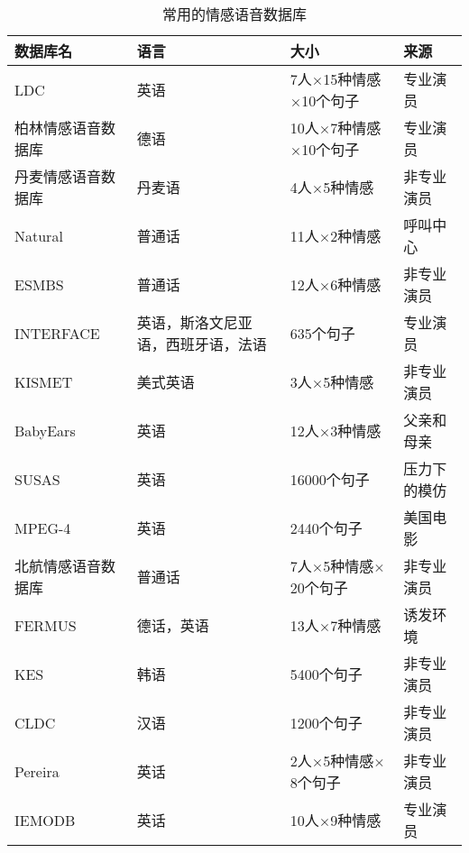 \begin{table}[htb]
\centering
    \begin{minipage}[t]{0.8\linewidth} %
    \caption{常用的情感语音数据库}
    \label{tab:emo_database}
        \begin{tabularx}{\linewidth}{X<{\centering} X<{\centering} X<{\centering} X<{\centering}}
            \toprule[1.5pt]
            数据库名 & 语言 & 大小 & 来源 \\
            \midrule[1pt]
            LDC & 英语 & 7人$\times$15种情感$\times$10个句子 & 专业演员 \\
            柏林情感语音数据库 & 德语 & 10人$\times$7种情感$\times$10个句子 & 专业演员 \\
            丹麦情感语音数据库 & 丹麦语 & 4人$\times$5种情感 & 非专业演员 \\
            Natural & 普通话 & 11人$\times$2种情感 & 呼叫中心 \\
            ESMBS & 普通话 & 12人$\times$6种情感 & 非专业演员 \\
            INTERFACE & 英语，斯洛文尼亚语，西班牙语，法语 & 635个句子 & 专业演员 \\
            KISMET & 美式英语 & 3人$\times$5种情感 & 非专业演员 \\
            BabyEars & 英语 & 12人$\times$3种情感 & 父亲和母亲 \\
            SUSAS & 英语 & 16000个句子 & 压力下的模仿 \\
            MPEG-4 & 英语 & 2440个句子 & 美国电影 \\
            北航情感语音数据库 & 普通话 & 7人$\times$5种情感$\times$20个句子 & 非专业演员 \\
            FERMUS \uppercase\expandafter{\romannumeral3} & 德话，英语 & 13人$\times$7种情感 & 诱发环境 \\
            KES & 韩语 & 5400个句子 & 非专业演员 \\
            CLDC & 汉语 & 1200个句子 & 非专业演员 \\
            Pereira & 英话 & 2人$\times$5种情感$\times$8个句子 & 非专业演员 \\
            IEMODB & 英话 & 10人$\times$9种情感 & 专业演员 \\
            \bottomrule[1.5pt]
        \end{tabularx}
    \end{minipage}
\end{table}

